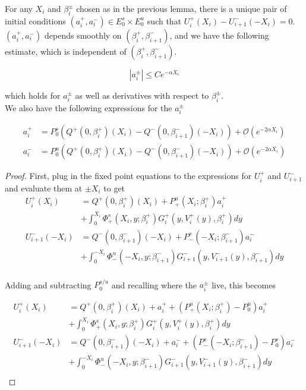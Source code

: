 \documentclass[thesis.tex]{subfiles}
\begin{document}
\begin{lemma}\label{solvefora}
For any $X_i$ and $\beta_i^\pm$ chosen as in the previous lemma, there is a unique pair of initial conditions $(a_i^+, a_i^-) \in E_0^s \times E_0^u$ such that $U_i^+(X_i) - U_{i+1}^-(-X_i) = 0$. $(a_i^+, a_i^-)$ depends smoothly on $(\beta_i^+, \beta_{i+1}^-)$, and we have the following estimate, which is independent of $(\beta_i^+, \beta_{i+1}^-)$.

\begin{equation}
|a_i^\pm| \leq C e^{-\alpha X_i}
\end{equation}

which holds for $a_i^\pm$ as well as derivatives with respect to $\beta_i^\pm$.\\

We also have the following expressions for the $a_i^\pm$

\begin{align*}
a_i^+ &= P^s_0 \left( Q^+(0, \beta_i^+)(X_i) - Q^-(0, \beta_{i+1}^-)(-X_i) \right) 
+ \mathcal{O}( e^{-2 \alpha X_i} )\\
a_i^- &= P^u_0 \left( Q^+(0, \beta_i^+)(X_i) - Q^-(0, \beta_{i+1}^-)(-X_i) \right) 
+ \mathcal{O}( e^{-2 \alpha X_i} )
\end{align*}

\begin{proof}

First, plug in the fixed point equations to the expressions for $U_i^+$ and $U_{i+1}^-$ and evaluate them at $\pm X_i$ to get
\begin{align*}
U_i^+(X_i) &= Q^+(0, \beta_i^+)(X_i) + P^u_+(X_i; \beta_i^+) a_i^+ \\
&+ \int_0^{X_i} \Phi_+^s(X_i, y; \beta_i^+) G_i^+(y, V_i^+(y),\beta_i^+)dy \\ 
U_{i+1}^-(-X_i) &= Q^-(0, \beta_{i+1}^-)(-X_i) + P^s_-(-X_i; \beta_{i+1}^-) a_i^- \\
&+ \int_0^{-X_i} \Phi_-^u(-X_i, y; \beta_{i+1}^-) G_{i+1}^-(y, V_{i+1}^-(y),\beta_{i+1}^-)dy \\
\end{align*}

Adding and subtracting $P_0^{s/u}$ and recalling where the $a_i^\pm$ live, this becomes

\begin{align*}
U_i^+(X_i) &= Q^+(0, \beta_i^+)(X_i) + a_i^+ + (P^u_+(X_i; \beta_i^+) -  P^u_0)a_i^+ \\
&+ \int_0^{X_i} \Phi_+^s(X_i, y; \beta_i^+) G_i^+(y, V_i^+(y),\beta_i^+)dy \\ 
U_{i+1}^-(-X_i) &= Q^-(0, \beta_{i+1}^-)(-X_i) + a_i^- + (P^s_-(-X_i; \beta_{i+1}^-) - P^s_0) a_i^- \\ 
&+ \int_0^{-X_i} \Phi_-^u(-X_i, y; \beta_{i+1}^-) G_{i+1}^-(y, V_{i+1}^-(y),\beta_{i+1}^-)dy \\
\end{align*}


\end{proof}
\end{lemma}
\end{document}
